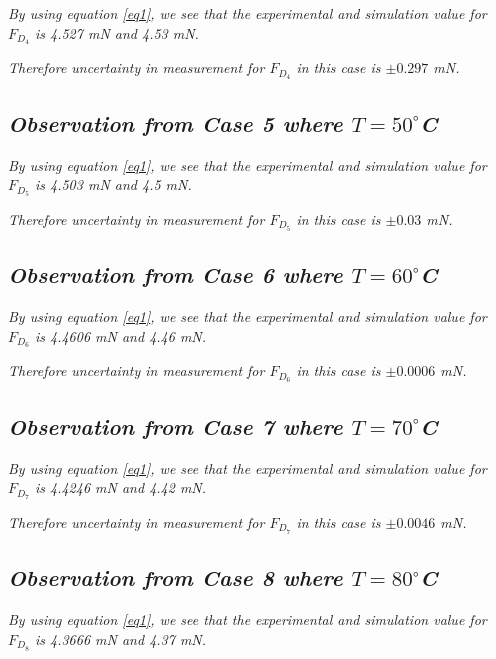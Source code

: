 	\textit{By using equation \ref{eq1}, we see that the experimental and simulation value for $F_{D_4}$ is 4.527 mN and 4.53 mN.}
        
	\textit{Therefore uncertainty in measurement for $F_{D_4}$ in this case is $\pm{\textit{0.297}}$ mN.}       
        
\subsection{\textit{Observation from Case 5 where $T = 50^\circ$C}}

	\textit{By using equation \ref{eq1}, we see that the experimental and simulation value for $F_{D_5}$ is 4.503 mN and 4.5 mN.}
        
	\textit{Therefore uncertainty in measurement for $F_{D_5}$ in this case is $\pm{\textit{0.03}}$ mN.}        
        
\subsection{\textit{Observation from Case 6 where $T = 60^\circ$C}}
        
	\textit{By using equation \ref{eq1}, we see that the experimental and simulation value for $F_{D_6}$ is 4.4606 mN and 4.46 mN.}
        
	\textit{Therefore uncertainty in measurement for $F_{D_6}$ in this case is $\pm{\textit{0.0006}}$ mN.}
        
\subsection{\textit{Observation from Case 7 where $T = 70^\circ$C}}
        
	\textit{By using equation \ref{eq1}, we see that the experimental and simulation value for $F_{D_7}$ is 4.4246 mN and 4.42 mN.}
        
	\textit{Therefore uncertainty in measurement for $F_{D_7}$ in this case is $\pm{\textit{0.0046}}$ mN.}
        
\subsection{\textit{Observation from Case 8 where $T = 80^\circ$C}}

	\textit{By using equation \ref{eq1}, we see that the experimental and simulation value for $F_{D_8}$ is 4.3666 mN and 4.37 mN.}
        
